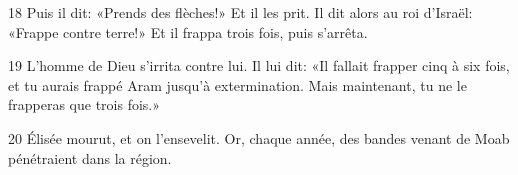 
18 Puis il dit: «Prends des flèches!» Et il les prit. Il dit alors au roi d’Israël: «Frappe contre terre!» Et il frappa trois fois, puis s’arrêta.

19 L’homme de Dieu s’irrita contre lui. Il lui dit: «Il fallait frapper cinq à six fois, et tu aurais frappé Aram jusqu’à extermination. Mais maintenant, tu ne le frapperas que trois fois.»

20 Élisée mourut, et on l’ensevelit. Or, chaque année, des bandes venant de Moab pénétraient dans la région.
